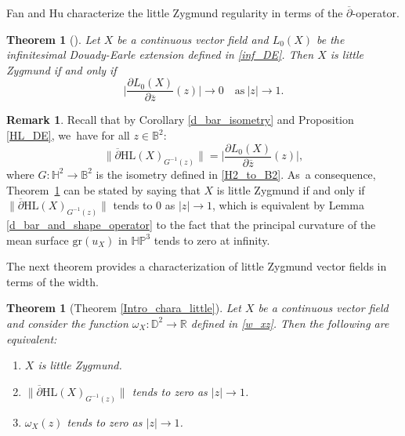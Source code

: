 \documentclass[10pt]{amsart}
\theoremstyle{plain}
\newtheorem{theorem}[cor]{Theorem}
\theoremstyle{definition}
\newtheorem{remark}[cor]{Remark}
\newcommand{\HP}{\mathbb{HP}^3}
\begin{document}
Fan and Hu characterize the little Zygmund regularity in terms of the $\overline{\partial}$-operator.
\begin{theorem}[{\cite[Th.\,3]{FanJun}}]\label{fan_hu_little}
Let $X$ be a continuous vector field and $L_0(X)$ be the infinitesimal Douady-Earle extension defined in \eqref{inf_DE}. Then $X$ is little Zygmund if and only if\vspace*{-3pt}
\[
\biggl|\frac{\partial L_0(X)}{\partial \overline{z}}(z)\biggr| \to 0 \quad \text{as}\ \lvert z\rvert\to 1.
\]
\end{theorem}
\begin{remark}\label{remark_little_zygmund}
Recall that by Corollary \ref{d_bar_isometry} and Proposition \ref{HL_DE}, we~have for all \(z \in \mathbb{B}^2\):\vspace*{-3pt}
\begin{equation}
\lVert \overline{\partial} \mathrm{HL}(X)_{G^{-1}(z)} \rVert = \biggl| \frac{\partial L_0(X)}{\partial \overline{z}}(z) \biggr|,
\end{equation}
where \(G: \mathbb{H}^2 \to \mathbb{B}^2\) is the isometry defined in \eqref{H2_to_B2}. As~a consequence, Theorem~\ref{fan_hu_little} can be stated by saying that \(X\) is little Zygmund if and only if
\(\lVert \overline{\partial} \mathrm{HL}(X)_{G^{-1}(z)} \rVert\) tends to $0$ as \(\lvert z \rvert \to 1\), which is equivalent by Lemma \ref{d_bar_and_shape_operator} to the fact that the principal curvature of the mean surface \(\mathrm{gr}(u_X)\) in \(\HP\) tends to zero at infinity.
\end{remark}

The next theorem provides a characterization of little Zygmund vector fields in terms of the width.

\begin{theorem}[Theorem \ref{Intro_chara_little}]\label{LZVF}
\label{width_goes_to_0}
Let $X$ be a continuous vector field and consider the function $\omega_{X}:\mathbb{D}^2\to \mathbb{R}$ defined in \eqref{w_xz}. Then the following are equivalent:
\begin{enumerate}
\item\label{LZVF1} $X$ is little Zygmund.
\item\label{LZVF2} $\lVert \overline{\partial}\mathrm{HL}(X)_{G^{-1}(z)}\rVert$ tends to zero as $\lvert z\rvert\to 1$.
\item\label{LZVF3} $\omega_X(z)$ tends to zero as $\lvert z\rvert\to 1$.
\end{enumerate}
\end{theorem}
\end{document}

